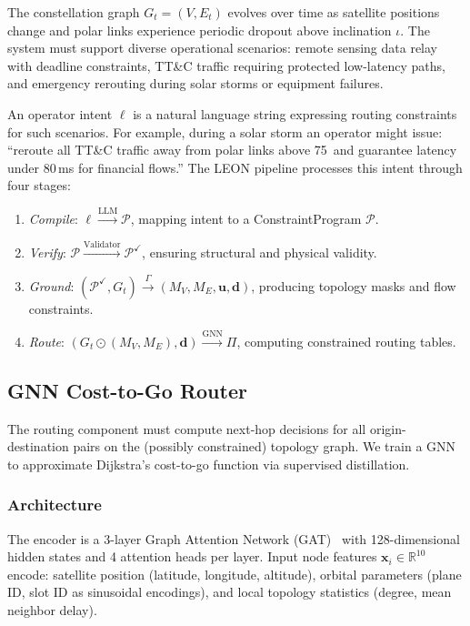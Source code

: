 \documentclass[10pt, conference, letterpaper]{IEEEtran}
\begin{document}
The constellation graph $G_t = (V, E_t)$ evolves over time as
satellite positions change and polar links experience periodic
dropout above inclination $\iota$. The system must support diverse
operational scenarios: remote sensing data relay with deadline
constraints, TT\&C traffic requiring protected low-latency paths,
and emergency rerouting during solar storms or equipment failures.

An operator intent $\ell$ is a natural language string expressing
routing constraints for such scenarios. For example, during a solar
storm an operator might issue: ``reroute all TT\&C traffic away from
polar links above 75\textdegree\ and guarantee latency under 80\,ms
for financial flows.'' The LEON pipeline processes this intent through
four stages:
\begin{enumerate}
\item \textit{Compile}: $\ell \xrightarrow{\text{LLM}} \mathcal{P}$,
mapping intent to a ConstraintProgram $\mathcal{P}$.
\item \textit{Verify}: $\mathcal{P} \xrightarrow{\text{Validator}}
\mathcal{P}^{\checkmark}$, ensuring structural and physical validity.
\item \textit{Ground}: $(\mathcal{P}^{\checkmark}, G_t)
\xrightarrow{\Gamma} (M_V, M_E, \mathbf{u}, \mathbf{d})$, producing
topology masks and flow constraints.
\item \textit{Route}: $(G_t \odot (M_V, M_E), \mathbf{d})
\xrightarrow{\text{GNN}} \Pi$, computing constrained routing tables.
\end{enumerate}



\subsection{GNN Cost-to-Go Router}
\label{sec:gnn_router}

The routing component must compute next-hop decisions for all
origin-destination pairs on the (possibly constrained) topology graph.
We train a GNN to approximate Dijkstra's cost-to-go function via
supervised distillation.

\subsubsection{Architecture}
The encoder is a 3-layer Graph Attention Network (GAT)~\cite{gat}
with 128-dimensional hidden states and 4 attention heads per layer.
Input node features $\mathbf{x}_i \in \mathbb{R}^{10}$ encode:
satellite position (latitude, longitude, altitude), orbital parameters
(plane ID, slot ID as sinusoidal encodings), and local topology
statistics (degree, mean neighbor delay).
\end{document}
